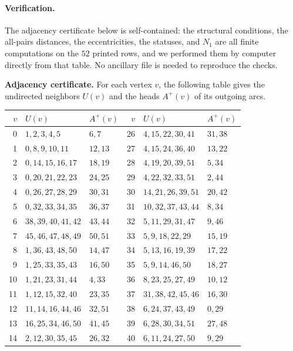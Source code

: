 \documentclass[11pt]{amsart}
\begin{document}
\paragraph{Verification.}
The adjacency certificate below is self-contained: the structural
conditions, the all-pairs distances, the eccentricities, the statuses,
and $N_1$ are all finite computations on the $52$ printed rows, and we
performed them by computer directly from that table. No ancillary file
is needed to reproduce the checks.

\medskip
\noindent\textbf{Adjacency certificate.}
For each vertex $v$, the following table gives the undirected neighbors
$U(v)$ and the heads $A^+(v)$ of its outgoing arcs.

\begin{center}
\fontsize{6.8}{7.15}\selectfont
\setlength{\tabcolsep}{3.2pt}
\renewcommand{\arraystretch}{0.96}
\begin{tabular}{rll@{\qquad}rll}
\toprule
$v$ & $U(v)$ & $A^+(v)$ & $v$ & $U(v)$ & $A^+(v)$ \\
\midrule
0 & $1,2,3,4,5$ & $6,7$ & 26 & $4,15,22,30,41$ & $31,38$ \\
1 & $0,8,9,10,11$ & $12,13$ & 27 & $4,15,24,36,40$ & $13,22$ \\
2 & $0,14,15,16,17$ & $18,19$ & 28 & $4,19,20,39,51$ & $5,34$ \\
3 & $0,20,21,22,23$ & $24,25$ & 29 & $4,22,32,33,51$ & $2,44$ \\
4 & $0,26,27,28,29$ & $30,31$ & 30 & $14,21,26,39,51$ & $20,42$ \\
5 & $0,32,33,34,35$ & $36,37$ & 31 & $10,32,37,43,44$ & $8,34$ \\
6 & $38,39,40,41,42$ & $43,44$ & 32 & $5,11,29,31,47$ & $9,46$ \\
7 & $45,46,47,48,49$ & $50,51$ & 33 & $5,9,18,22,29$ & $15,19$ \\
8 & $1,36,43,48,50$ & $14,47$ & 34 & $5,13,16,19,39$ & $17,22$ \\
9 & $1,25,33,35,43$ & $16,50$ & 35 & $5,9,14,46,50$ & $18,27$ \\
10 & $1,21,23,31,44$ & $4,33$ & 36 & $8,23,25,27,49$ & $10,12$ \\
11 & $1,12,15,32,40$ & $23,35$ & 37 & $31,38,42,45,46$ & $16,30$ \\
12 & $11,14,16,44,46$ & $32,51$ & 38 & $6,24,37,43,49$ & $0,29$ \\
13 & $16,25,34,46,50$ & $41,45$ & 39 & $6,28,30,34,51$ & $27,48$ \\
14 & $2,12,30,35,45$ & $26,32$ & 40 & $6,11,24,27,50$ & $9,29$ \\

\end{tabular}
\end{center}
\end{document}
